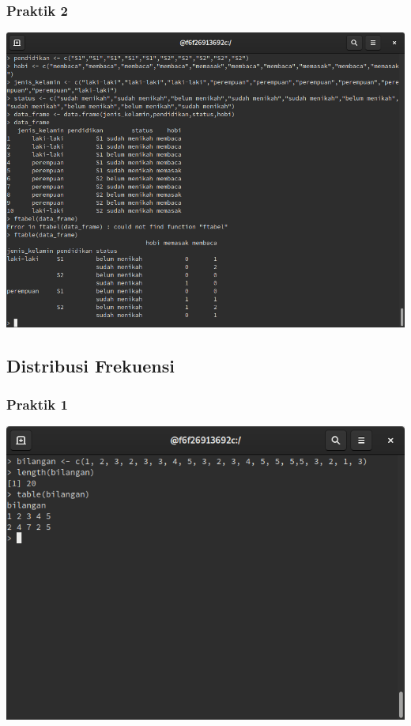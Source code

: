 \documentclass[a4paper,12pt]{article}
\begin{document}
\subsubsection{Praktik 2}
\includegraphics[width=\linewidth]{2}
\subsection{Distribusi Frekuensi}
\subsubsection{Praktik 1}
\includegraphics[width=\linewidth]{3}
\end{document}
